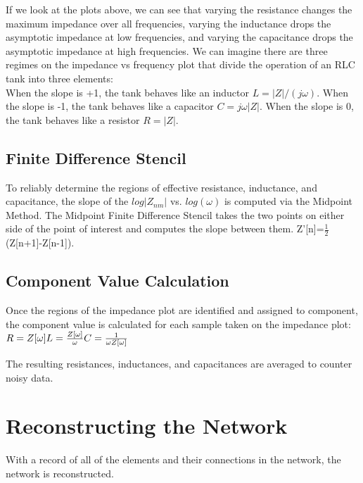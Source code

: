 \documentclass[12pt,twoside,vi]{mitthesis}
\begin{document}
If we look at the plots above, we can see that varying the resistance changes the maximum impedance over all frequencies, varying the inductance drops the asymptotic impedance at low frequencies, and varying the capacitance drops the asymptotic impedance at high frequencies.
We can imagine there are three regimes on the impedance vs frequency plot that divide the operation of an RLC tank into three elements:\\
When the slope is +1, the tank behaves like an inductor
$L=|Z|/(j\omega)$.
When the slope is -1, the tank behaves like a capacitor
$C=j\omega |Z|$.
When the slope is 0, the tank behaves like a resistor
$R=|Z|$.


\subsection{Finite Difference Stencil}
To reliably determine the regions of effective resistance, inductance, and capacitance, the slope of the $log{|Z_{nm}|}$ vs. $log{(\omega)}$ is computed via the Midpoint Method.
The Midpoint Finite Difference Stencil takes the two points on either side of the point of interest and computes the slope between them.
Z'[n]=$\frac{1}{2}$(Z[n+1]-Z[n-1]).

\subsection{Component Value Calculation}
Once the regions of the impedance plot are identified and assigned to component, the component value is calculated for each sample taken on the impedance plot:\\
$R = Z[\omega]\\
L = \frac{Z[\omega]}{\omega}\\
C = \frac{1}{\omega Z[\omega]} 
$ 

The resulting resistances, inductances, and capacitances are averaged to counter noisy data.


\section{Reconstructing the Network}
With a record of all of the elements and their connections in the network, the network is reconstructed.
\end{document}
